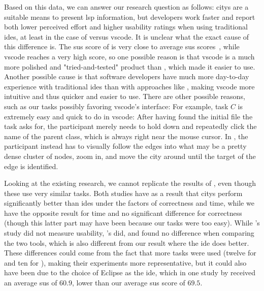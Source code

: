 \documentclass[../thesis]{subfiles}
\begin{document}
Based on this data, we can answer our research question as follows:
\Glspl{city} are a suitable means to present \gls{lsp} information, but developers work faster and report both lower perceived effort and higher usability ratings when using traditional \glspl{ide}, at least in the case of \SEE{} versus \gls{vscode}.
It is unclear what the exact cause of this difference is.
The \gls{sus} score of \SEE{} is very close to average \gls{sus} scores~\cite{sauro2013}, while \gls{vscode} reaches a very high score, so one possible reason is that \gls{vscode} is a much more polished and "tried-and-tested" product than \SEE{}, which made it easier to use.
Another possible cause is that software developers have much more day-to-day experience with traditional \glspl{ide} than with approaches like \SEE{}, making \gls{vscode} more intuitive and thus quicker and easier to use.
There are other possible reasons, such as our tasks possibly favoring \gls{vscode}'s interface:
For example, task $C$ is extremely easy and quick to do in \gls{vscode}:
After having found the initial file the task asks for, the participant merely needs to hold down  and repeatedly click the name of the parent class, which is always right near the mouse cursor.
In \SEE{}, the participant instead has to visually follow the edges into what may be a pretty dense cluster of nodes, zoom in, and move the city around until the target of the edge is identified.

Looking at the existing research, we cannot replicate the results of \textcite{wettel2011,romano2019}, even though these use very similar tasks.
Both studies have as a result that \glspl{city} perform significantly better than \glspl{ide} under the factors of correctness and time, while we have the opposite result for time and no significant difference for correctness (though this latter part may have been because our tasks were too easy).
While \citeauthor{wettel2011}'s study did not measure usability, \citeauthor{romano2019}'s did, and found no difference when comparing the two tools, which is also different from our result where the \gls{ide} does better.
These differences could come from the fact that more tasks were used (twelve for \citeauthor{wettel2011} and ten for \citeauthor{romano2019}), making their experiments more representative, but it could also have been due to the choice of Eclipse as the \gls{ide}, which in one study by \textcite{morales2019} received an average \gls{sus} of $60.9$, lower than our average \SEE{} \gls{sus} score of $69.5$.
\end{document}
